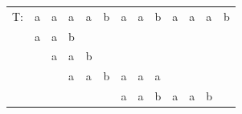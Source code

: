 \begin{table}[h]
\centering
\label{my-label6}
\begin{tabular}{lllllllllllll}
\cline{2-13}
\multicolumn{1}{l|}{T:} & \multicolumn{1}{l|}{a} & \multicolumn{1}{l|}{a} & \multicolumn{1}{l|}{a}                         & \multicolumn{1}{l|}{a}                         & \multicolumn{1}{l|}{b} & \multicolumn{1}{l|}{a}                         & \multicolumn{1}{l|}{a}                         & \multicolumn{1}{l|}{b}                         & \multicolumn{1}{l|}{a}                         & \multicolumn{1}{l|}{a}                         & \multicolumn{1}{l|}{a}                         & \multicolumn{1}{l|}{b} \\ \cline{2-13} 
\multicolumn{1}{l|}{}   & \multicolumn{1}{l|}{a} & \multicolumn{1}{l|}{a} & \multicolumn{1}{l|}{\cellcolor[HTML]{FD6864}b} &                                                &                        &                                                &                                                &                                                &                                                &                                                &                                                &                        \\ \cline{2-5}
                        & \multicolumn{1}{l|}{}  & \multicolumn{1}{l|}{a} & \multicolumn{1}{l|}{a}                         & \multicolumn{1}{l|}{\cellcolor[HTML]{FD6864}b} &                        &                                                &                                                &                                                &                                                &                                                &                                                &                        \\ \cline{3-9}
                        &                        & \multicolumn{1}{l|}{}  & \multicolumn{1}{l|}{a}                         & \multicolumn{1}{l|}{a}                         & \multicolumn{1}{l|}{b} & \multicolumn{1}{l|}{a}                         & \multicolumn{1}{l|}{a}                         & \multicolumn{1}{l|}{\cellcolor[HTML]{FD6864}a} &                                                &                                                &                                                &                        \\ \cline{4-12}
                        &                        &                        &                                                &                                                & \multicolumn{1}{l|}{}  & \multicolumn{1}{l|}{\cellcolor[HTML]{9AFF99}a} & \multicolumn{1}{l|}{\cellcolor[HTML]{9AFF99}a} & \multicolumn{1}{l|}{\cellcolor[HTML]{9AFF99}b} & \multicolumn{1}{l|}{\cellcolor[HTML]{9AFF99}a} & \multicolumn{1}{l|}{\cellcolor[HTML]{9AFF99}a} & \multicolumn{1}{l|}{\cellcolor[HTML]{9AFF99}b} &                        \\ \cline{7-12}

\end{tabular}
\end{table}
